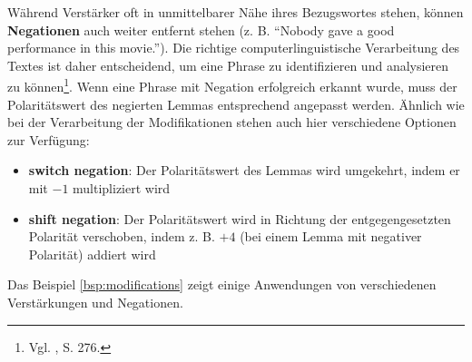 \documentclass[
	a4paper,
	12pt,
	bibliography=totocnumbered,
	twoside,
]{scrreprt}
\begin{document}
Während Verstärker oft in unmittelbarer Nähe ihres Bezugswortes stehen, können \textbf{Negationen} auch weiter entfernt stehen (z. B. "`Nobody gave a good performance in this movie."'). Die richtige computerlinguistische Verarbeitung des Textes ist daher entscheidend, um eine Phrase zu identifizieren und analysieren zu können\footnote{Vgl. \citet{taboada2011}, S. 276.}. Wenn eine Phrase mit Negation erfolgreich erkannt wurde, muss der Polaritätswert des negierten Lemmas entsprechend angepasst werden. Ähnlich wie bei der Verarbeitung der Modifikationen stehen auch hier verschiedene Optionen zur Verfügung:

\begin{itemize}
	\item \textbf{switch negation}: Der Polaritätswert des Lemmas wird umgekehrt, indem er mit $-1$ multipliziert wird
	\item \textbf{shift negation}: Der Polaritätswert wird in Richtung der entgegengesetzten Polarität verschoben, indem z. B. $+4$ (bei einem Lemma mit negativer Polarität) addiert wird
\end{itemize}

Das Beispiel \ref{bsp:modifications} zeigt einige Anwendungen von verschiedenen Verstärkungen und Negationen.
\end{document}
